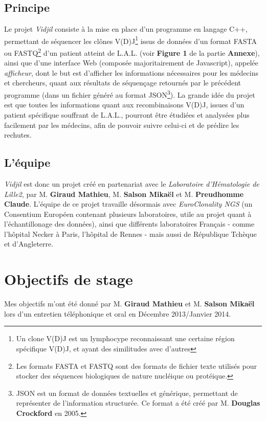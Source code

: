 \documentclass[12pt]{report}
\begin{document}
\begin{spacing}{1.2}
\subsection{Principe}
Le projet \textit{Vidjil} consiste à la mise en place d'un programme en langage C++, permettant de séquencer les clônes V(D)J\footnote{Un clone V(D)J est un lymphocype reconnaissant une certaine région spécifique V(D)J, et ayant des similitudes avec d'autres} issus de données d'un format FASTA ou FASTQ\footnote{Les formats FASTA et FASTQ sont des formats de fichier texte utilisés pour stocker des séquences biologiques de nature nucléique ou protéique.} d'un patient atteint de L.A.L. (voir \textbf{Figure 1} de la partie \textbf{Annexe}), ainsi que d'une interface Web (composée majoritairement de Javascript), appelée \textit{afficheur}, dont le but est d'afficher les informations nécessaires pour les médecins et chercheurs, quant aux résultats de séquençage retournés par le précédent programme (dans un fichier généré au format JSON\footnote{JSON est un format de données textuelles et générique, permettant de représenter de l'information structurée. Ce format a été créé par M. \textbf{Douglas Crockford} en 2005.}).
\newline
La grande idée du projet est que toutes les informations quant aux recombinaisons V(D)J, issues d'un patient spécifique souffrant de L.A.L., pourront être étudiées et analysées plus facilement par les médecins, afin de pouvoir suivre celui-ci et de prédire les rechutes.

\subsection{L'équipe}
\textit{Vidjil} est donc un projet créé en partenariat avec le \textit{Laboratoire d'Hématologie de Lille2}, par M. \textbf{Giraud Mathieu}, M. \textbf{Salson Mikaël} et M. \textbf{Preudhomme Claude}.
\newline
L'équipe de ce projet travaille désormais avec \textit{EuroClonality NGS} (un Consentium Européen contenant plusieurs laboratoires, utile au projet quant à l'échantillonage des données), ainsi que différents laboratoires Français - comme l'hôpital Necker à Paris, l'hôpital de Rennes - mais aussi de République Tchèque et d'Angleterre.

\section{Objectifs de stage}
Mes objectifs m'ont été donné par M. \textbf{Giraud Mathieu} et M. \textbf{Salson Mikaël} lors d'un entretien téléphonique et oral en Décembre 2013/Janvier 2014.


\end{spacing}
\end{document}
